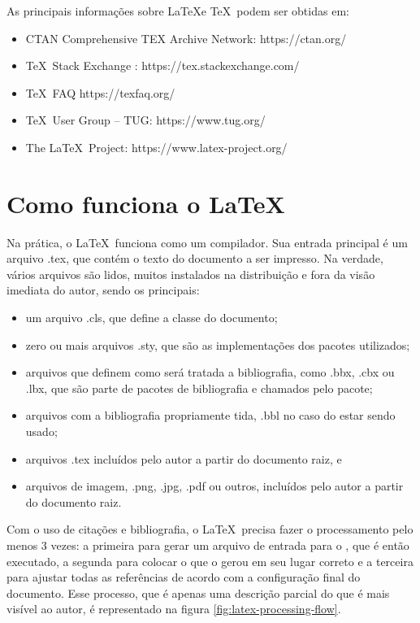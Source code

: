     
As principais informações sobre \LaTeX  e \TeX\  podem ser obtidas em:
    \begin{itemize}
    \item CTAN Comprehensive TEX Archive Network: https://ctan.org/
    \item \TeX\ Stack Exchange :  https://tex.stackexchange.com/
    \item \TeX\ FAQ https://texfaq.org/
    \item \TeX\ User Group – TUG: https://www.tug.org/
    \item The \LaTeX\ Project: https://www.latex-project.org/
\end{itemize}


\section{Como funciona o \LaTeX}

Na prática, o \LaTeX\ funciona como um compilador. Sua entrada principal é um arquivo .tex, que contém o texto do documento a ser impresso. Na verdade, vários arquivos são lidos, muitos instalados na distribuição e fora da visão imediata do autor, sendo os principais:
\begin{itemize}
    \item um arquivo .cls, que define a classe do documento;
    \item zero ou mais arquivos .sty, que são as implementações dos pacotes utilizados;
    \item arquivos que definem como será tratada a bibliografia, como 
    .bbx, .cbx ou .lbx, que são parte de pacotes de bibliografia e chamados
    pelo pacote;
    \item arquivos com a bibliografia propriamente tida, .bbl no caso do  estar sendo usado;
    \item arquivos .tex incluídos pelo autor a partir do documento raiz, e
    \item arquivos de imagem, .png, .jpg, .pdf ou outros, incluídos pelo autor a partir do documento raiz.
\end{itemize}

Com o uso de citações e bibliografia, o \LaTeX\   precisa fazer o processamento pelo menos 3 vezes: a primeira para gerar um arquivo de entrada para o , que é então executado, a segunda para colocar o que o  gerou em seu lugar correto e a terceira para ajustar todas as referências de acordo com a configuração final do documento. Esse processo, que é apenas uma descrição parcial do que é mais visível ao autor, é representado na figura \ref{fig:latex-processing-flow}.

